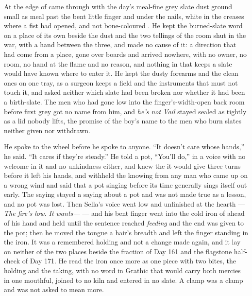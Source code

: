 \scenebreak

At the edge of   came through with the day's meal-fine grey slate dust ground small as meal past the bent little finger and under the nails, white in the creases where a fist had opened, and not bone-coloured . He kept the burned-slate word on a place of its own beside the dust and the two tellings of the room shut in the war, with a hand between the three, and made no cause of it: a direction that had come from a place, gone over boards and arrived nowhere, with no owner, no room, no hand at the flame and no reason, and nothing in  that keeps a slate would have known where to enter it. He kept the dusty forearms and the clean ones on one tray, as a surgeon keeps a field and the instruments that must not touch it, and asked neither which slate had been broken nor whether it had been a birth-slate. The men who had gone low into the finger's-width-open back room before first grey got no name from him, and \emph{he's not Vail} stayed sealed as tightly as a lid nobody lifts, the promise of the boy's name to the men who burn slates neither given nor withdrawn.

He spoke to the wheel before he spoke to anyone. “It doesn't care whose hands,” he said. “It cares if they're steady.” He told a pot, “You'll do,” in a voice with no welcome in it and no unkindness either, and knew the  it would give three turns before it left his hands, and withheld the knowing from any man who came up on a wrong wind and said that a pot singing before its time generally sings itself out early. The saying stayed a saying about a pot and was not made true as a lesson, and no pot was lost. Then Sella's voice went low and unfinished at the hearth --- \emph{The fire's low. It wants---} --- and his bent finger went into the cold iron of  ahead of his hand and held until the sentence reached \emph{feeding} and the end was given to the pot; then he moved the tongue a hair's breadth and left the finger standing in the iron. It was a remembered holding and not a change made again, and it lay on neither of the two places beside the fraction of Day 161 and the flagstone half-check of Day 171. He read the iron once more as one piece with two bites, the holding and the taking, with no word in Grathic that would carry both mercies in one mouthful, joined to no kiln and entered in no slate. A clamp was a clamp and was not asked to mean more.

\scenebreak


